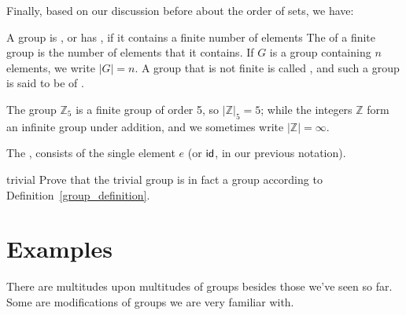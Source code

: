 Finally, based on our discussion before about the order of sets, we have:

\begin{defn} \label{group_order}
A group is , or has , if it contains a finite number of elements The 
of a finite group is the number of elements that it contains. If $G$
is a group containing $n$ elements, we write $|G| =
n$. A group that is not finite is called , and such a group is said to be of .
\end{defn} 

The group ${\mathbb Z}_5$ is a finite group of order
5, so $|{\mathbb Z}|_5=5$; while the integers ${\mathbb Z}$ form an infinite group under addition, and
we sometimes write $|{\mathbb Z}| = \infty$.

\begin{defn} \label{trivial_group}
The , consists of the single element $e$  (or ${\sf{i}d}$, in our previous notation).
\end{defn} 

\begin{exercise}{trivial}
Prove that the trivial group is in fact a group according to Definition~\ref{group_definition}.
\end{exercise}

\section{Examples}\label{Examples}

There are multitudes upon multitudes of groups besides those we've seen so far.  Some are modifications of groups we are very familiar with.  

